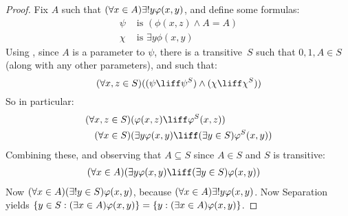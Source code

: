 \documentclass[../../../include/open-logic-section]{subfiles}
\begin{document}
\begin{proof}
Fix $A$ such that $(\forall x \in A)\exists \bang  y\phi(x,y)$, and
define some formulas:
\begin{align*}
	\psi &\text{ is } (\phi(x, z) \land A = A)\\
	\chi &\text{ is } \exists y \phi(x, y)
\end{align*}
Using , since $A$ is a parameter to $\psi$, there
is a transitive~$S$ such that $0, 1, A \in S$  (along with any other
parameters), and such that:
\[
	(\forall x,z \in S)((\psi \liff \psi^S) \land (\chi \liff \chi^S))
\]
So in particular:
\begin{align*}
	(\forall  x, z \in S)(&\phi(x, z) \liff \phi^S(x, z))\\
	(\forall x \in S)(&\exists y\phi(x, y) \liff (\exists y \in S)\phi^S(x, y)) 
\end{align*}
Combining these, and observing that $A \subseteq S$ since $A \in S$ and $S$ is transitive:
\begin{align*}
	(\forall x \in A)(&\exists y\phi(x, y) \liff (\exists y \in S)\phi(x, y))
\end{align*}
Now $(\forall x \in A)(\exists \bang y \in S)\phi(x, y)$, because
$(\forall x \in A)\exists \bang y \phi(x, y)$. Now Separation yields
$\{ y \in S : (\exists x \in A) \varphi(x, y) \} = \{ y : (\exists
x \in A) \varphi(x, y) \}$. 
\end{proof}

\end{document}

